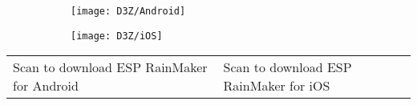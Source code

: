 \documentclass[a4paper,12pt]{book}
\begin{document}
\begin{figure}[h!]
    \Centering
    \begin{subfigure}{0.45\textwidth}
        \RaggedLeft
        \texttt{[image: D3Z/Android]} 
    \end{subfigure}\hspace{40pt}
    \begin{subfigure}{0.45\textwidth}
        \RaggedRight
        \texttt{[image: D3Z/iOS]}
    \end{subfigure}
\end{figure}

\begin{tabular}{>{\Centering}m{20em} >{\Centering}m{18em}}
\small{Scan to download ESP RainMaker for Android}&\small{Scan to download ESP RainMaker for iOS}
\end{tabular}
\end{document}
